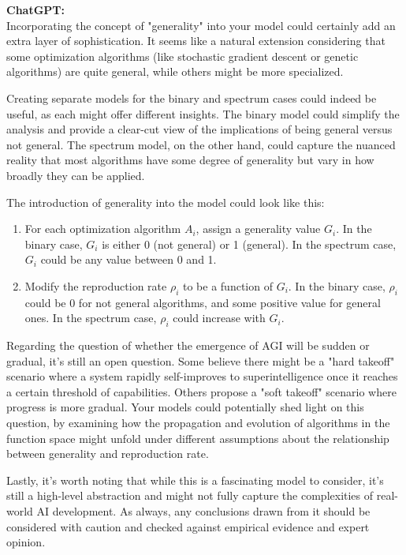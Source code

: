 \documentclass{article}[10pt]
\begin{document}
\noindent \textbf{ChatGPT:}\\
Incorporating the concept of "generality" into your model could certainly add an extra layer of sophistication. 
It seems like a natural extension considering that some optimization algorithms (like stochastic gradient descent or genetic algorithms) are quite general, while others might be more specialized.\par

Creating separate models for the binary and spectrum cases could indeed be useful, as each might offer different insights. 
The binary model could simplify the analysis and provide a clear-cut view of the implications of being general versus not general. 
The spectrum model, on the other hand, could capture the nuanced reality that most algorithms have some degree of generality but vary in how broadly they can be applied.\par

The introduction of generality into the model could look like this:
\begin{enumerate}
    \item For each optimization algorithm $A_i$, assign a generality value $G_i$. In the binary case, $G_i$ is either 0 (not general) or 1 (general). 
    In the spectrum case, $G_i$ could be any value between 0 and 1.
    \item Modify the reproduction rate $\rho_i$ to be a function of $G_i$. 
    In the binary case, $\rho_i$ could be 0 for not general algorithms, and some positive value for general ones. 
    In the spectrum case, $\rho_i$ could increase with $G_i$.
\end{enumerate}

Regarding the question of whether the emergence of AGI will be sudden or gradual, it's still an open question. 
Some believe there might be a "hard takeoff" scenario where a system rapidly self-improves to superintelligence once it reaches a certain threshold of capabilities. 
Others propose a "soft takeoff" scenario where progress is more gradual. 
Your models could potentially shed light on this question, by examining how the propagation and evolution of algorithms in the function space might unfold under different assumptions about the relationship between generality and reproduction rate.\par

Lastly, it's worth noting that while this is a fascinating model to consider, it's still a high-level abstraction and might not fully capture the complexities of real-world AI development. 
As always, any conclusions drawn from it should be considered with caution and checked against empirical evidence and expert opinion.\par
\end{document}
